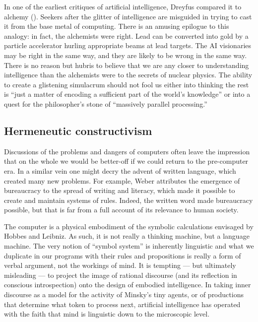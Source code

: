 \documentclass[12pt]{article}
\begin{document}
In one of the earliest critiques of artificial intelligence, Dreyfus compared it to alchemy (\cite{dreyfus1965}). Seekers after the glitter of intelligence are misguided in trying to cast it from the base metal of computing. There is an amusing epilogue to this analogy: in fact, the alchemists were right. Lead can be converted into gold by a particle accelerator hurling appropriate beams at lead targets. The AI visionaries may be right in the same way, and they are likely to be wrong in the same way. There is no reason but hubris to believe that we are any closer to understanding intelligence than the alchemists were to the secrets of nuclear physics. The ability to create a glistening simulacrum should not fool us either into thinking the rest is ``just a matter of encoding a sufficient part of the world's knowledge'' or into a quest for the philosopher's stone of ``massively parallel processing.''

\subsection{Hermeneutic constructivism}

Discussions of the problems and dangers of computers often leave the impression that on the whole we would be better-off if we could return to the pre-computer era. In a similar vein one might decry the advent of written language, which created many new problems. For example, Weber attributes the emergence of bureaucracy to the spread of writing and literacy, which made it possible to create and maintain systems of rules. Indeed, the written word made bureaucracy possible, but that is far from a full account of its relevance to human society.

The computer is a physical embodiment of the symbolic calculations envisaged by Hobbes and Leibniz. As such, it is not really a thinking machine, but a language machine. The very notion of ``symbol system'' is inherently linguistic and what we duplicate in our programs with their rules and propositions is really a form of verbal argument, not the workings of mind. It is tempting --- but ultimately misleading --- to project the image of rational discourse (and its reflection in conscious introspection) onto the design of embodied intelligence. In taking inner discourse as a model for the activity of Minsky's tiny agents, or of productions that determine what token to process next, artificial intelligence has operated with the faith that mind is linguistic down to the microscopic level.
\end{document}

